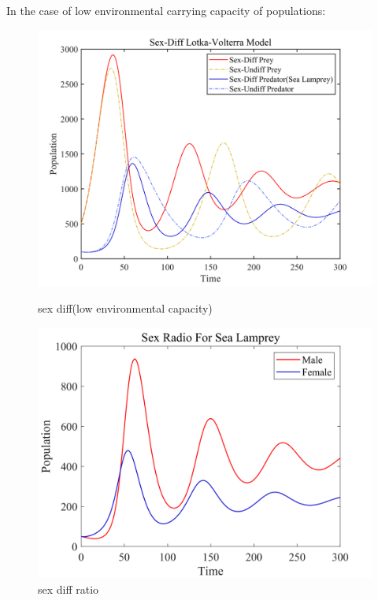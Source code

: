 \documentclass[12pt]{article}  %
\begin{document}
\par
In the case of low environmental carrying capacity of populations:
\begin{figure}[htbp]
	\begin{minipage}[b]{0.5\linewidth}
		\centering
		\includegraphics[width=\linewidth]{img/diff31.png}
		\caption{sex diff(low environmental capacity)}
	\end{minipage}%
	\begin{minipage}[b]{0.5\linewidth}
		\centering
		\includegraphics[width=\linewidth]{img/diff32.png}
		\caption{sex diff ratio}
	\end{minipage}
	\label{fi:3_1}
\end{figure}
\end{document}
